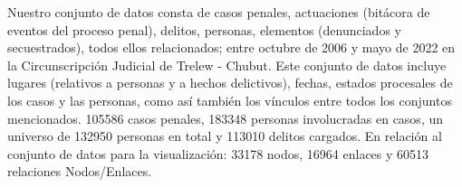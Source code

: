 Nuestro conjunto de datos consta de casos penales, actuaciones (bitácora de eventos del proceso penal), delitos, personas, elementos (denunciados y secuestrados), todos ellos relacionados; entre octubre de 2006 y mayo de 2022 en la Circunscripción Judicial de Trelew - Chubut. Este conjunto de datos incluye lugares (relativos a personas y a hechos delictivos), fechas, estados procesales de los casos y las personas, como así también los vínculos entre todos los conjuntos mencionados. 105586 casos penales, 183348 personas involucradas en casos, un universo de 132950 personas en total y 113010 delitos cargados. En relación al conjunto de datos para la visualización: 33178 nodos, 16964 enlaces y 60513 relaciones Nodos/Enlaces.